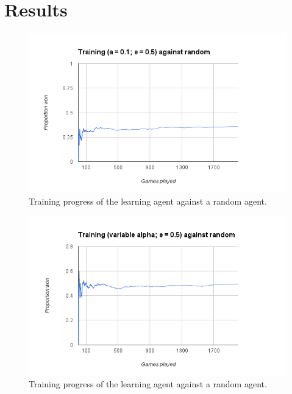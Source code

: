\documentclass[letterpaper]{article}
\begin{document}
\section{Results}

\begin{figure}
  \vspace{-2em}
  \begin{center}
    \includegraphics[width=\textwidth]{a1e5training.png}
    \vspace{-3em}
  \caption{Training progress of the learning agent against a random agent.\label{a1e5}}
  \vspace{-1em}
  \end{center}
\end{figure}

\begin{figure}
  \vspace{-2em}
  \begin{center}
    \includegraphics[width=\textwidth]{varae5training.png}
    \vspace{-3em}
  \caption{Training progress of the learning agent against a random agent.\label{a1e5}}
  \vspace{-1em}
  \end{center}
\end{figure}
\end{document}
